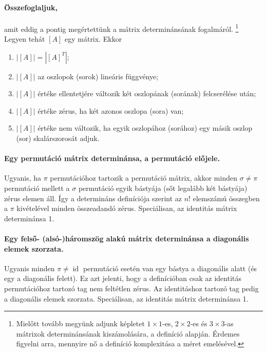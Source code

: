 \documentclass[a4paper, showtrims]{memoir}
\theoremstyle{plain}
\theoremstyle{remark}
\theoremstyle{definition}
\DeclareMathOperator{\id}{id}
\begin{document}
\paragraph{Összefoglaljuk,} amit eddig a pontig megértettünk a mátrix determinánsának fogalmáról.
\footnote{
	Mielőtt tovább megyünk adjunk képletet $1\times 1$-es,
	$2\times 2$-es és $3\times 3$-as mátrixok determinánsának kiszámolására, a definíció alapján.
	Érdemes figyelni arra, mennyire nő a definíció komplexitása a méret emelésével.
}
Legyen tehát $[A]$ egy mátrix. Ekkor
\begin{enumerate}
	\item $|[A]|=|[A]^T|$;
	\item $|[A]|$ az oszlopok (sorok) lineáris függvénye;
	\item $|[A]|$ értéke ellentetjére változik két oszlopának (sorának) felcserélése után;
	\item $|[A]|$ értéke zérus, ha két azonos oszlopa (sora) van;
	\item $|[A]|$ értéke nem változik, ha egyik oszlopához (sorához) egy másik oszlop (sor) skalárszorosát adjuk.
\end{enumerate}

\paragraph{Egy permutáció mátrix determinánsa, a permutáció előjele.}
Ugyanis, ha $\pi$ permutációhoz tartozik a permutáció mátrix, akkor minden $\sigma\neq\pi$ permutáció mellett
a $\sigma$ permutáció egyik bástyája (sőt legalább két bástyája) zérus elemen áll.
Így a determináns definíciója szerint az $n!$ elemszámú összegben a $\pi$ kivételével minden összeadandó zérus.
Speciálisan, az identitás mátrix determinánsa 1.

\paragraph{Egy felső- (alsó-)háromszög alakú mátrix determinánsa a diagonális elemek szorzata.}
Ugyanis minden $\pi\neq\id$ permutáció esetén van egy bástya a diagonális alatt (és egy a diagonális felett).
Ez azt jelenti, hogy a definícióban csak az identitás permutációhoz tartozó tag nem feltétlen zérus.
Az identitáshoz tartozó tag pedig a diagonális elemek szorzata.
Speciálisan, az identitás mátrix determinánsa 1.
\end{document}
